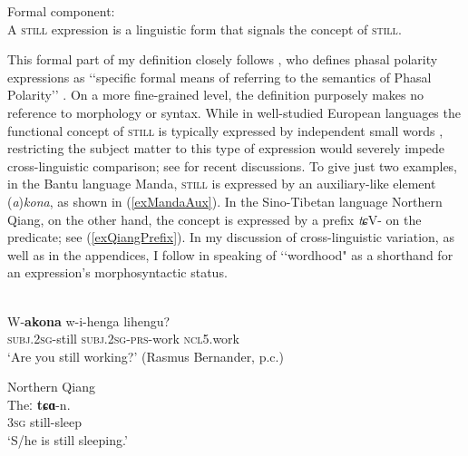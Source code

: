 \begin{exe}
	Formal component:\\A \textsc{still} expression is a linguistic form that signals the concept of \textsc{still}.
\end{exe}

This formal part of my definition closely follows \textcite{vanBaar1997}, who defines phasal polarity expressions as \lq\lq specific formal means of referring to the semantics of Phasal Polarity\rq\rq{ }\parencite[48]{vanBaar1997}. On a more fine-grained level, the definition purposely makes no reference to morphology or syntax. While in well-studied European languages the functional concept of \textsc{still} is typically expressed by independent small words \parencite{vanderAuwera1998}, restricting the subject matter to this type of expression would severely impede cross-linguistic comparison; see \textcite{Kramer2017, Kramer2021b} for recent discussions. To give just two examples, in the Bantu language Manda, \textsc{still} is expressed by an auxiliary-like element \mbox{(\textit{a})\textit{kona}}, as shown in (\ref{exMandaAux}). In the Sino-Tibetan language Northern Qiang, on the other hand, the concept is expressed by a prefix \mbox{\textit{tɕ}V-} on the predicate; see (\ref{exQiangPrefix}). In my discussion of cross-linguistic variation, as well as in the appendices, I follow \textcite{Kramer2017} in speaking of \lq\lq wordhood" as a shorthand for an expression's morphosyntactic status.

\begin{exe}
	\ex\label{exMandaAux}\\
	\gll W-\textbf{akona} w-i-henga lihengu?\\
	\textsc{subj}.2\textsc{sg}-still \textsc{subj}.2\textsc{sg}-\textsc{prs}-work \textsc{ncl5}.work\\
	\glt \lq Are you still working?\rq{ }(Rasmus Bernander, p.c.)
	
	\ex \label{exQiangPrefix} Northern Qiang \\
	\gll Theː \textbf{tɕɑ}-n.\\
	3\textsc{sg} still-sleep\\
	\glt \lq S/he is still sleeping.\rq{ }\parencite[228]{LaPollaHuang2003}
\end{exe}

